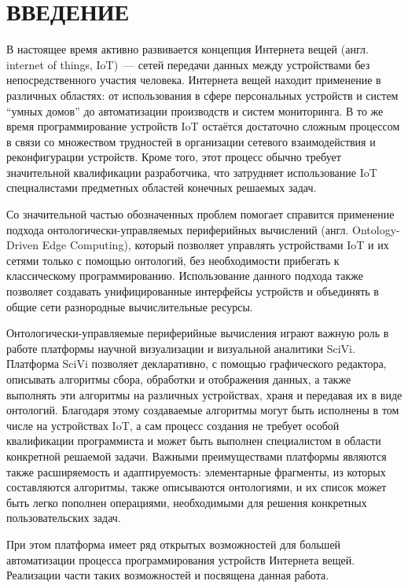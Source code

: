 \chapter*{ВВЕДЕНИЕ}

В настоящее время активно развивается концепция Интернета вещей (англ. internet of things, IoT)~--- сетей передачи данных между устройствами без непосредственного участия человека.
Интернета вещей находит применение в различных областях: от использования в сфере персональных устройств и систем "`умных домов"' до автоматизации производств и систем мониторинга.
В то же время программирование устройств IoT остаётся достаточно сложным процессом в связи со множеством трудностей в организации сетевого взаимодействия и реконфигурации устройств.
Кроме того, этот процесс обычно требует значительной квалификации разработчика, что затрудняет использование IoT специалистами предметных областей конечных решаемых задач.

Со значительной частью обозначенных проблем помогает справится применение подхода онтологически-управляемых периферийных вычислений (англ. Ontology-Driven Edge Computing), который позволяет управлять устройствами IoT и их сетями только с помощью онтологий, без необходимости прибегать к классическому программированию\cite{incollection:odec}.
Использование данного подхода также позволяет создавать унифицированные интерфейсы устройств и объединять в общие сети разнородные вычислительные ресурсы\cite{incollection:eon-communications}.

Онтологически-управляемые периферийные вычисления играют важную роль в работе платформы научной визуализации и визуальной аналитики SciVi\cite{article:scivi, article:scivi-overview}.
Платформа SciVi позволяет декларативно, с помощью графического редактора, описывать алгоритмы сбора, обработки и отображения данных, а также выполнять эти алгоритмы на различных устройствах, храня и передавая их в виде онтологий.
Благодаря этому создаваемые алгоритмы могут быть исполнены в том числе на устройствах IoT, а сам процесс создания не требует особой квалификации программиста и может быть выполнен специалистом в области конкретной решаемой задачи.
Важными преимуществами платформы являются также расширяемость и адаптируемость: элементарные фрагменты, из которых составляются алгоритмы, также описываются онтологиями, и их список может быть легко пополнен операциями, необходимыми для решения конкретных пользовательских задач.

При этом платформа имеет ряд открытых возможностей для большей автоматизации процесса программирования устройств Интернета вещей.
Реализации части таких возможностей и посвящена данная работа.

